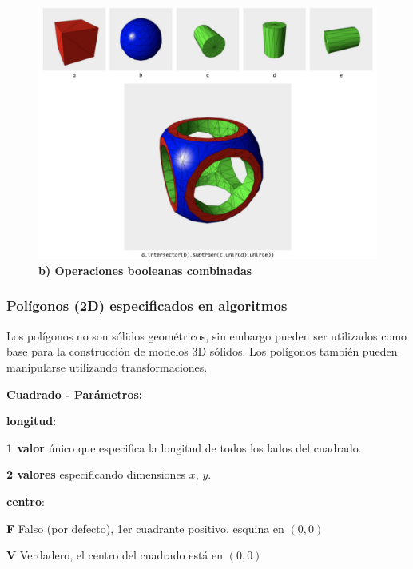 \begin{figure}[h]
\includegraphics[width=15cm]{Img/Modelos/modelado16.jpg}
\centering
\caption{\textbf{ \footnotesize{b) Operaciones booleanas combinadas }}}
\label{bCSG}
\end{figure}
\clearpage

\subsubsection{Polígonos (2D) especificados en algoritmos}
Los polígonos no son sólidos geométricos, sin embargo pueden ser utilizados como base para la construcción de modelos 3D sólidos. Los polígonos también pueden manipularse utilizando transformaciones.

\begin{description}
\item  \textbf{Cuadrado - Parámetros:}
\item   \textbf{longitud}:
\begin{description}
\item \textbf{1 valor} único que especifica la longitud de todos los lados del cuadrado.
\item \textbf{2 valores} especificando dimensiones $x$, $y$.
\end{description}
\item   \textbf{centro}:
\begin{description}
\item \textbf{F} Falso (por defecto), 1er cuadrante positivo, esquina en $(0, 0)$
\item \textbf{V} Verdadero, el centro del cuadrado está en $(0, 0)$
\end{description}
\end{description}

